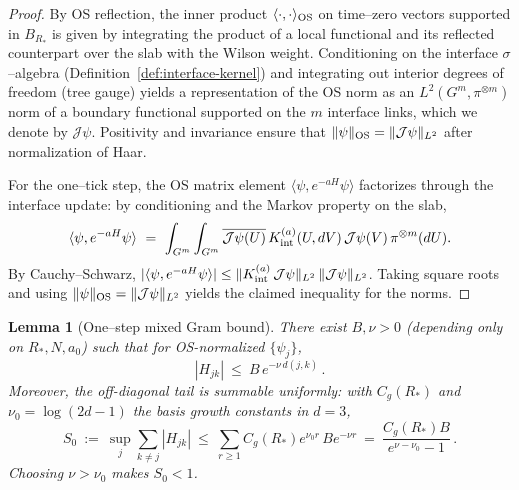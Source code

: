 \documentclass[11pt]{amsart}
\theoremstyle{plain}
\newtheorem{lemma}[theorem]{Lemma}
\theoremstyle{definition}
\theoremstyle{remark}
\begin{document}
\begin{proof}
By OS reflection, the inner product $\langle\cdot,\cdot\rangle_{\rm OS}$ on time--zero vectors supported in $B_{R_*}$ is given by integrating the product of a local functional and its reflected counterpart over the slab with the Wilson weight. Conditioning on the interface $\sigma$--algebra (Definition~\ref{def:interface-kernel}) and integrating out interior degrees of freedom (tree gauge) yields a representation of the OS norm as an $L^2(G^m,\pi^{\otimes m})$ norm of a boundary functional supported on the $m$ interface links, which we denote by $\mathcal J\psi$. Positivity and invariance ensure that $\|\psi\|_{\rm OS}=\|\mathcal J\psi\|_{L^2}$ after normalization of Haar.

For the one--tick step, the OS matrix element $\langle\psi, e^{-aH}\psi\rangle$ factorizes through the interface update: by conditioning and the Markov property on the slab,
\[
  \langle\psi, e^{-aH}\psi\rangle\ =\ \int_{G^m}\int_{G^m} \overline{\mathcal J\psi(U)}\, K_{\rm int}^{(a)}(U,dV)\, \mathcal J\psi(V)\,\pi^{\otimes m}(dU).
\]
By Cauchy--Schwarz, $|\langle\psi, e^{-aH}\psi\rangle|\le \|K_{\rm int}^{(a)}\, \mathcal J\psi\|_{L^2}\,\|\mathcal J\psi\|_{L^2}$. Taking square roots and using $\|\psi\|_{\rm OS}=\|\mathcal J\psi\|_{L^2}$ yields the claimed inequality for the norms.
\end{proof}

\begin{lemma}[One--step mixed Gram bound]\label{lem:mixed-gram-bound}
There exist $B,\nu>0$ (depending only on $R_*,N,a_0$) such that for OS-normalized $\{\psi_j\}$,
\[
  |H_{jk}|\ \le\ B\,e^{-\nu\,d(j,k)}\,.
\]
Moreover, the off-diagonal tail is summable uniformly: with $C_g(R_*)$ and $\nu_0=\log(2d-1)$ the basis growth constants in $d=3$,
\[
  S_0\ :=\ \sup_j \sum_{k\ne j} |H_{jk}|\ \le\ \sum_{r\ge 1} C_g(R_*) e^{\nu_0 r}\, B e^{-\nu r}\ =\ \frac{C_g(R_*) B}{e^{\nu-\nu_0}-1}\,.
\]
Choosing $\nu>\nu_0$ makes $S_0<1$.
\end{lemma}
\end{document}
